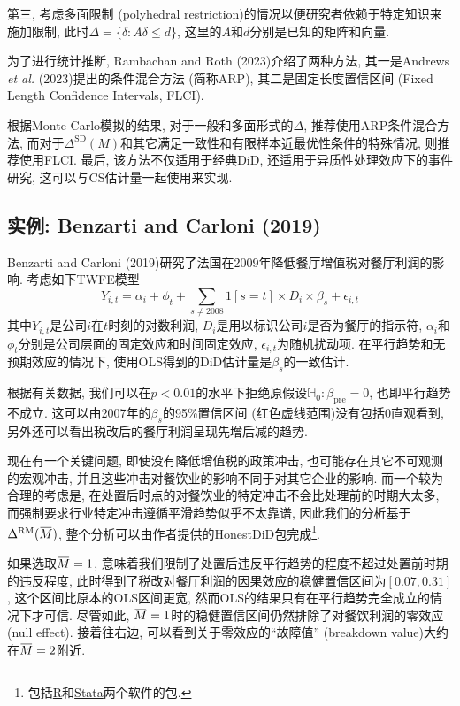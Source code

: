 \documentclass[cn,sakura,14pt,screen,bibstyle=gb7714-2015,math=mtpro2]{elegantnote}
\newcommand{\overbar}[1]{\mkern 1.5mu\overline{\mkern-1.5mu#1\mkern-1.5mu}\mkern 1.5mu}
\begin{document}
第三, 考虑多面限制 (polyhedral restriction)的情况以便研究者依赖于特定知识来施加限制, 此时$\Delta=\{\delta:A\delta\leq d\}$, 这里的$A$和$d$分别是已知的矩阵和向量.

为了进行统计推断, Rambachan and Roth (2023)介绍了两种方法, 其一是Andrews \emph{et al.} (2023)提出的条件混合方法 (简称ARP), 其二是固定长度置信区间 (Fixed Length Confidence Intervals, FLCI).

根据Monte Carlo模拟的结果, 对于一般和多面形式的$\Delta$, 推荐使用ARP条件混合方法, 而对于$\Delta^\text{SD}(M)$和其它满足一致性和有限样本近最优性条件的特殊情况, 则推荐使用FLCI. 最后, 该方法不仅适用于经典DiD, 还适用于异质性处理效应下的事件研究, 这可以与CS估计量一起使用来实现.

\subsection{实例: Benzarti and Carloni (2019)}
Benzarti and Carloni (2019)研究了法国在2009年降低餐厅增值税对餐厅利润的影响. 考虑如下TWFE模型
$$Y_{i,t}=\alpha_i+\phi_t+\sum_{s\ne2008}1[s=t]\times D_i\times \beta_s+\epsilon_{i,t}$$
其中$Y_{i,t}$是公司$i$在$t$时刻的对数利润, $D_i$是用以标识公司$i$是否为餐厅的指示符, $\alpha_i$和$\phi_t$分别是公司层面的固定效应和时间固定效应, $\epsilon_{i,t}$为随机扰动项. 在平行趋势和无预期效应的情况下, 使用OLS得到的DiD估计量是$\beta_s$的一致估计.

根据有关数据, 我们可以在$p<0.01$的水平下拒绝原假设$\mathbb{H}_0:\beta_\text{pre}=0$, 也即平行趋势不成立. 这可以由2007年的$\beta_s$的95\%置信区间 (红色虚线范围)没有包括0直观看到, 另外还可以看出税改后的餐厅利润呈现先增后减的趋势.

现在有一个关键问题, 即使没有降低增值税的政策冲击, 也可能存在其它不可观测的宏观冲击, 并且这些冲击对餐饮业的影响不同于对其它企业的影响. 而一个较为合理的考虑是, 在处置后时点的对餐饮业的特定冲击不会比处理前的时期大太多, 而强制要求行业特定冲击遵循平滑趋势似乎不太靠谱, 因此我们的分析基于$\Delta^\text{RM}(\overbar{M})$, 整个分析可以由作者提供的HonestDiD包完成\footnote{包括\href{https://github.com/asheshrambachan/HonestDiD}{R}和\href{https://github.com/mcaceresb/stata-honestdid}{Stata}两个软件的包.}.

如果选取$\overbar{M}=1$, 意味着我们限制了处置后违反平行趋势的程度不超过处置前时期的违反程度, 此时得到了税改对餐厅利润的因果效应的稳健置信区间为$[0.07,0.31]$, 这个区间比原本的OLS区间更宽, 然而OLS的结果只有在平行趋势完全成立的情况下才可信. 尽管如此, $\overbar{M}=1$时的稳健置信区间仍然排除了对餐饮利润的零效应 (null effect). 接着往右边, 可以看到关于零效应的“故障值” (breakdown value)大约在$\overbar{M}=2$附近.
\end{document}
